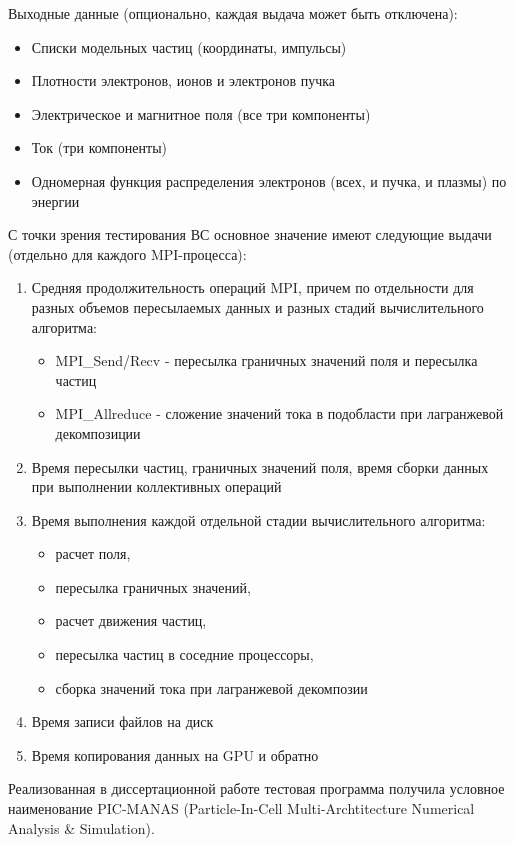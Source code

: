 Выходные данные (опционально, каждая выдача может быть отключена):
\begin{itemize}
\item Списки модельных частиц (координаты, импульсы)
\item Плотности электронов, ионов и электронов пучка
\item Электрическое и магнитное поля (все три компоненты)
\item Ток (три компоненты)
\item Одномерная функция распределения электронов (всех, и пучка, и плазмы) по энергии
\end{itemize}

С точки зрения тестирования ВС основное значение имеют следующие выдачи (отдельно для каждого MPI-процесса):

\begin{enumerate}
	\item Средняя продолжительность операций MPI, причем по отдельности для разных объемов пересылаемых данных и разных стадий вычислительного алгоритма:
	\begin{itemize}
		\item MPI\_Send/Recv - пересылка граничных значений поля и пересылка частиц
		\item MPI\_Allreduce - сложение значений тока в подобласти при лагранжевой декомпозиции
		
	\end{itemize}	
	\item Время пересылки частиц, граничных значений поля, время сборки данных при выполнении коллективных операций   
	\item Время выполнения каждой отдельной стадии вычислительного алгоритма:
	\begin{itemize}
		\item расчет поля, 
		\item пересылка граничных значений, 
		\item расчет движения частиц, 
		\item пересылка частиц в соседние процессоры, 
		\item сборка значений тока при лагранжевой декомпозии
	\end{itemize}
	\item Время записи файлов на диск 
	\item Время копирования данных на GPU и обратно
	
\end{enumerate}

Реализованная в диссертационной работе тестовая программа получила условное наименование 
PIC-MANAS (Particle-In-Cell Multi-Archtitecture Numerical Analysis \& Simulation).

